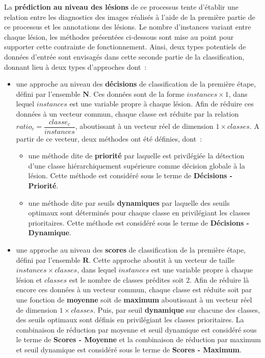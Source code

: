 La \textbf{prédiction au niveau des lésions} de ce processus tente d'établir une relation entre les diagnostics des images réalisés à l'aide de la première partie de ce processus et les annotations des lésions. Le nombre d'instances variant entre chaque lésion, les méthodes présentées ci-dessous sont mise au point pour supporter cette contrainte de fonctionnement. Ainsi, deux types potentiels de données d'entrée sont envisagés dans cette seconde partie de la classification, donnant lieu à deux types d'approches dont~:
\begin{itemize}
    \item   une approche au niveau des \textbf{décisions} de classification de la première étape, défini par l'ensemble $\mathbf{N}$. Ces données sont de la forme $instances \times 1$, dans lequel $instances$ est une variable propre à chaque lésion. Afin de réduire ces données à un vecteur commun, chaque classe est réduite par la relation $ratio_c = \dfrac{classe_c}{instances}$, aboutissant à un vecteur réel de dimension $1 \times classes$. A partir de ce vecteur, deux méthodes ont été définies, dont~:
            \begin{itemize}
                \item une méthode dite de \textbf{priorité} par laquelle est privilégiée la détection d'une classe hiérarchiquement supérieure comme décision globale à la lésion. Cette méthode est considéré sous le terme de \textbf{Décisions - Priorité}.
                \item une méthode dite par seuils \textbf{dynamiques} par laquelle des seuils optimaux sont déterminés pour chaque classe en privilégiant les classes prioritaires. Cette méthode est considéré sous le terme de \textbf{Décisions - Dynamique}.
            \end{itemize}
    \item   une approche au niveau des \textbf{scores} de classification de la première étape, défini par l'ensemble $\mathbf{R}$. Cette approche aboutit à un vecteur de taille $instances \times classes$, dans lequel $instances$ est une variable propre à chaque lésion et $classes$ est le nombre de classes prédites soit 2. Afin de réduire là encore ces données à un vecteur commun, chaque classe est réduite soit par une fonction de \textbf{moyenne} soit de \textbf{maximum} aboutissant à un vecteur réel de dimension $1 \times classes$. Puis, par seuil \textbf{dynamique} sur chacune des classes, des seuils optimaux sont définis en privilégiant les classes prioritaires. La combinaison de réduction par moyenne et seuil dynamique est considéré sous le terme de \textbf{Scores - Moyenne} et la combinaison de réduction par maximum et seuil dynamique est considéré sous le terme de  \textbf{Scores - Maximum}.
\end{itemize}\par
\clearpage

